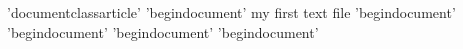 ’documentclass{article}’
’begin{document}’
my first text file
’begin{document}’
’begin{document}’
’begin{document}’
’begin{document}’
